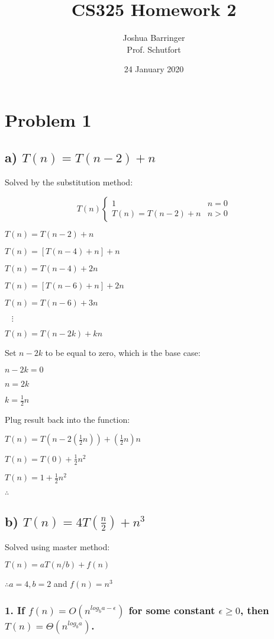 \documentclass{article}
\title{CS325 Homework 2}
\author{Joshua Barringer \\ Prof. Schutfort}
\date{24 January 2020}
\begin{document}
\maketitle

\section*{Problem 1}

\subsection*{a) $T(n) = T(n - 2) + n$}

Solved by the substitution method:

\[
    T(n)
    \begin{cases} 
      1 & n = 0 \\
      T(n) = T(n - 2) + n & n > 0
   \end{cases}
\]

$T(n) = T(n - 2) + n$

$T(n) = [T(n - 4) + n] + n$

$T(n) = T(n - 4) + 2n$

$T(n) = [T(n - 6) + n] + 2n$

$T(n) = T(n - 6) + 3n$

$\;\;\;\vdots$

$T(n) = T(n - 2k) + kn$

Set $n - 2k$ to be equal to zero, which is the base case:

$n - 2k = 0$

$n = 2k$

$k = \frac{1}{2}n$

Plug result back into the function:

$T(n) = T(n - 2(\frac{1}{2}n)) + (\frac{1}{2}n)n$

$T(n) = T(0) + \frac{1}{2}n^2$

$T(n) = 1 + \frac{1}{2}n^2$

$\therefore$  

\subsection*{b) $T(n) = 4T(\frac{n}{2}) + n^3$}

Solved using master method:

$T(n) = aT(n/b) + f(n)$

$\therefore a = 4, b = 2$ and $f(n) = n^3$

\subsubsection*{1. If $f(n) = O(n^{log_ba - \epsilon})$ for some constant $\epsilon \geq  0$, then $T(n) = \Theta(n^{log_ba})$.}
\end{document}
